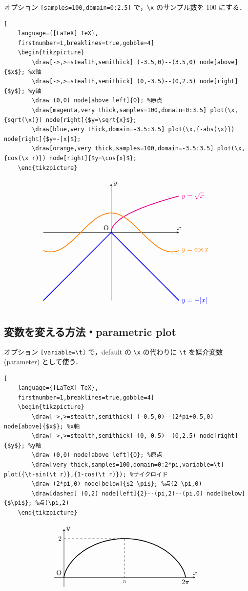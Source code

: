 \documentclass[lualatex]{jlreq}
\begin{document}
オプション \verb|[samples=100,domain=0:2.5]| で，\verb|\x| のサンプル数を 100 にする．
\begin{lstlisting}[
    language={[LaTeX] TeX},
    firstnumber=1,breaklines=true,gobble=4]
    \begin{tikzpicture}
        \draw[->,>=stealth,semithick] (-3.5,0)--(3.5,0) node[above]{$x$}; %x軸
        \draw[->,>=stealth,semithick] (0,-3.5)--(0,2.5) node[right]{$y$}; %y軸
        \draw (0,0) node[above left]{O}; %原点
        \draw[magenta,very thick,samples=100,domain=0:3.5] plot(\x,{sqrt(\x)}) node[right]{$y=\sqrt{x}$};
        \draw[blue,very thick,domain=-3.5:3.5] plot(\x,{-abs(\x)}) node[right]{$y=-|x|$};
        \draw[orange,very thick,samples=100,domain=-3.5:3.5] plot(\x,{cos(\x r)}) node[right]{$y=\cos{x}$};
    \end{tikzpicture}
\end{lstlisting}
\[
    \begin{tikzpicture}
    \draw[->,>=stealth,semithick] (-3.5,0)--(3.5,0) node[above]{$x$}; %
    \draw[->,>=stealth,semithick] (0,-3.5)--(0,2.5) node[right]{$y$}; %
    \draw (0,0) node[above left]{O}; %
    \draw[magenta,very thick,samples=100,domain=0:3.5] plot(\x,{sqrt(\x)}) node[right]{$y=\sqrt{x}$};
    \draw[blue,very thick,domain=-3.5:3.5] plot(\x,{-abs(\x)}) node[right]{$y=-|x|$};
    \draw[orange,very thick,samples=100,domain=-3.5:3.5] plot(\x,{cos(\x r)}) node[right]{$y=\cos{x}$};
    \end{tikzpicture}
\]

\subsection{変数を変える方法・parametric plot}

オプション \verb|[variable=\t]| で，default の \verb|\x| の代わりに \verb|\t| を媒介変数 (parameter) として使う．
\begin{lstlisting}[
    language={[LaTeX] TeX},
    firstnumber=1,breaklines=true,gobble=4]
    \begin{tikzpicture}
        \draw[->,>=stealth,semithick] (-0.5,0)--(2*pi+0.5,0) node[above]{$x$}; %x軸
        \draw[->,>=stealth,semithick] (0,-0.5)--(0,2.5) node[right]{$y$}; %y軸
        \draw (0,0) node[above left]{O}; %原点
        \draw[very thick,samples=100,domain=0:2*pi,variable=\t] plot({\t-sin(\t r)},{1-cos(\t r)}); %サイクロイド
        \draw (2*pi,0) node[below]{$2 \pi$}; %点(2 \pi,0)
        \draw[dashed] (0,2) node[left]{2}--(pi,2)--(pi,0) node[below]{$\pi$}; %点(\pi,2)
    \end{tikzpicture}
\end{lstlisting}
\[
    \begin{tikzpicture}
    \draw[->,>=stealth,semithick] (-0.5,0)--(2*pi+0.5,0) node[above]{$x$}; %
    \draw[->,>=stealth,semithick] (0,-0.5)--(0,2.5) node[right]{$y$}; %
    \draw (0,0) node[above left]{O}; %
    \draw[very thick,samples=100,domain=0:2*pi,variable=\t] plot({\t-sin(\t r)},{1-cos(\t r)}); %
    \draw (2*pi,0) node[below]{$2 \pi$}; %
    \draw[dashed] (0,2) node[left]{2}--(pi,2)--(pi,0) node[below]{$\pi$}; %
    \end{tikzpicture}
\]
\end{document}
